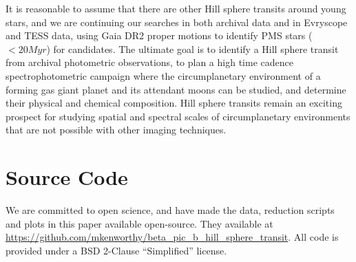 \documentclass[longauth]{aa} %
\begin{document}
It is reasonable to assume that there are other Hill sphere transits around young stars, and we are continuing our searches in both archival data and in Evryscope and TESS data, using Gaia DR2 proper motions to identify PMS stars ($<20Myr$) for candidates.
%
The ultimate goal is to identify a Hill sphere transit from archival photometric observations, to plan a high time cadence spectrophotometric campaign where the circumplanetary environment of a forming gas giant planet and its attendant moons can be studied, and determine their physical and chemical composition.
%
Hill sphere transits remain an exciting prospect for studying spatial and spectral scales of circumplanetary environments that are not possible with other imaging techniques.

\section{Source Code}
We are committed to open science, and have made the data, reduction scripts and plots in this paper available open-source.
%
They available at \url{https://github.com/mkenworthy/beta_pic_b_hill_sphere_transit}.
%
All code is provided under a BSD 2-Clause ``Simplified'' license. 

\end{document}
